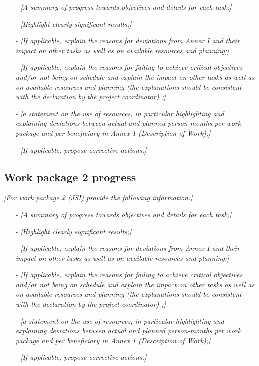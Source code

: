 \documentclass[12pt,a4paper,twoside]{article}
\begin{document}
\begin{itemize}
\item[-] \emph{\color{red}[A summary of progress towards objectives and details for each task;]}
\item[-] \emph{\color{red}[Highlight clearly significant results;]}
\item[-] \emph{\color{red}[If applicable, explain the reasons for deviations from Annex I and their impact on other tasks as well as on available resources and planning;]}
\item[-] \emph{\color{red}[If applicable, explain the reasons for failing to achieve critical objectives and/or not being on schedule and explain the impact on other tasks as well as on available resources and planning (the explanations should be consistent with the declaration by the project coordinator) ;]}
\item[-] \emph{\color{red}[a statement on the use of resources, in particular highlighting and explaining deviations between actual and planned  person-months per work package and per beneficiary in Annex 1 (Description of Work);]}
\item[-] \emph{\color{red}[If applicable, propose corrective actions.]}
\end{itemize}

\subsection{Work package 2 progress}

\emph{\color{red}[For work package 2 (JSI) provide the following information:]}

\begin{itemize}
\item[-] \emph{\color{red}[A summary of progress towards objectives and details for each task;]}
\item[-] \emph{\color{red}[Highlight clearly significant results;]}
\item[-] \emph{\color{red}[If applicable, explain the reasons for deviations from Annex I and their impact on other tasks as well as on available resources and planning;]}
\item[-] \emph{\color{red}[If applicable, explain the reasons for failing to achieve critical objectives and/or not being on schedule and explain the impact on other tasks as well as on available resources and planning (the explanations should be consistent with the declaration by the project coordinator) ;]}
\item[-] \emph{\color{red}[a statement on the use of resources, in particular highlighting and explaining deviations between actual and planned  person-months per work package and per beneficiary in Annex 1 (Description of Work);]}
\item[-] \emph{\color{red}[If applicable, propose corrective actions.]}
\end{itemize}
\end{document}
